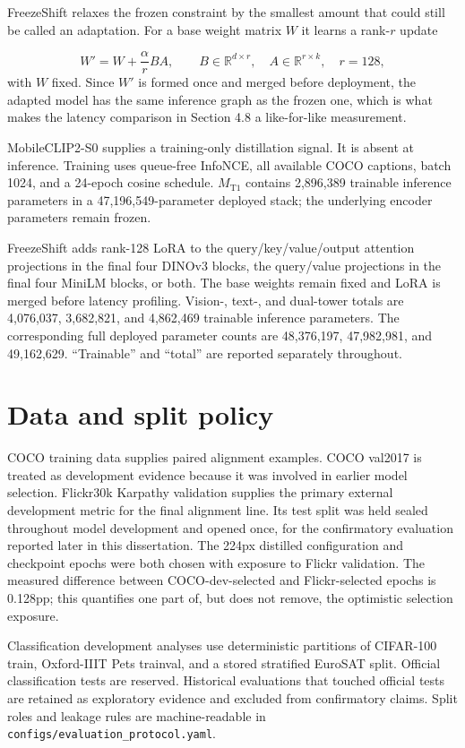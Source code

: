 \documentclass[11pt,a4paper,oneside]{report}
\newcommand{\MTone}{\ensuremath{M_{\mathrm{T1}}}}
\begin{document}
FreezeShift relaxes the frozen constraint by the smallest amount that could still be called an adaptation. For a base weight matrix $W$ it learns a rank-$r$ update

\begin{equation*}
W' = W + \frac{\alpha}{r} BA,
\qquad
B \in \mathbb{R}^{d \times r},
\quad
A \in \mathbb{R}^{r \times k},
\quad
r = 128,
\end{equation*}
with $W$ fixed. Since $W'$ is formed once and merged before deployment, the adapted model has the same inference graph as the frozen one, which is what makes the latency comparison in Section 4.8 a like-for-like measurement.

MobileCLIP2-S0 supplies a training-only distillation signal. It is absent at inference. Training uses queue-free InfoNCE, all available COCO captions, batch 1024, and a 24-epoch cosine schedule. \MTone{} contains 2,896,389 trainable inference parameters in a 47,196,549-parameter deployed stack; the underlying encoder parameters remain frozen.

FreezeShift adds rank-128 LoRA to the query/key/value/output attention projections in the final four DINOv3 blocks, the query/value projections in the final four MiniLM blocks, or both. The base weights remain fixed and LoRA is merged before latency profiling. Vision-, text-, and dual-tower totals are 4,076,037, 3,682,821, and 4,862,469 trainable inference parameters. The corresponding full deployed parameter counts are 48,376,197, 47,982,981, and 49,162,629. ``Trainable'' and ``total'' are reported separately throughout.

\section{Data and split policy}
COCO training data supplies paired alignment examples. COCO val2017 is treated as development evidence because it was involved in earlier model selection. Flickr30k Karpathy validation supplies the primary external development metric for the final alignment line. Its test split was held sealed throughout model development and opened once, for the confirmatory evaluation reported later in this dissertation. The 224px distilled configuration and checkpoint epochs were both chosen with exposure to Flickr validation. The measured difference between COCO-dev-selected and Flickr-selected epochs is 0.128pp; this quantifies one part of, but does not remove, the optimistic selection exposure.

Classification development analyses use deterministic partitions of CIFAR-100 train, Oxford-IIIT Pets trainval, and a stored stratified EuroSAT split. Official classification tests are reserved. Historical evaluations that touched official tests are retained as exploratory evidence and excluded from confirmatory claims. Split roles and leakage rules are machine-readable in \texttt{configs/\linebreak[1]evaluation\_\linebreak[1]protocol.\linebreak[1]yaml}.
\end{document}
